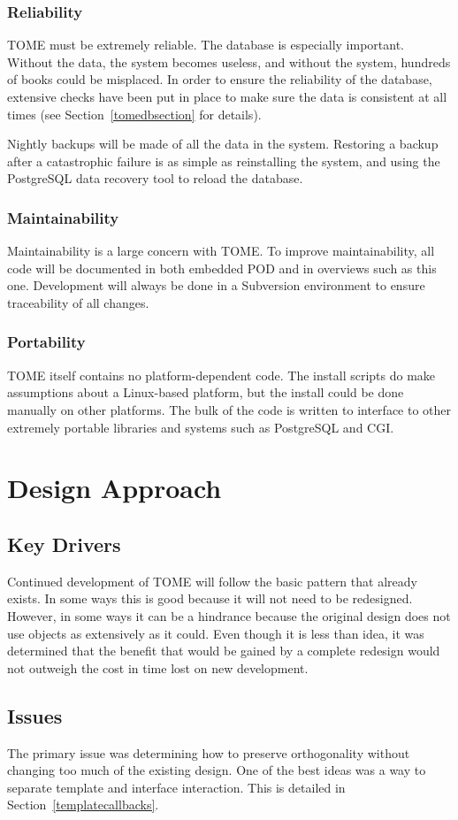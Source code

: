 \documentclass[12pt,titlepage]{article}
\begin{document}
\subsubsection{Reliability}
TOME must be extremely reliable.  The database is especially important.  Without the data, the system becomes useless, and without the system, hundreds of books could be misplaced.  In order to ensure the reliability of the database, extensive checks have been put in place to make sure the data is consistent at all times (see Section~\ref{tomedbsection} for details).

Nightly backups will be made of all the data in the system.  Restoring a backup after a catastrophic failure is as simple as reinstalling the system, and using the PostgreSQL data recovery tool to reload the database.
\subsubsection{Maintainability}
Maintainability is a large concern with TOME.  To improve maintainability, all code will be documented in both embedded POD and in overviews such as this one.  Development will always be done in a Subversion environment to ensure traceability of all changes.
\subsubsection{Portability}
TOME itself contains no platform-dependent code.  The install scripts do make assumptions about a Linux-based platform, but the install could be done manually on other platforms.  The bulk of the code is written to interface to other extremely portable libraries and systems such as PostgreSQL and CGI.
\section{Design Approach}
\subsection{Key Drivers}
Continued development of TOME will follow the basic pattern that already exists.  In some ways this is good because it will not need to be redesigned.  However, in some ways it can be a hindrance because the original design does not use objects as extensively as it could.  Even though it is less than idea, it was determined that the benefit that would be gained by a complete redesign would not outweigh the cost in time lost on new development.
\subsection{Issues}
The primary issue was determining how to preserve orthogonality without changing too much of the existing design.  One of the best ideas was a way to separate template and interface interaction.  This is detailed in Section~\ref{templatecallbacks}.
\end{document}
